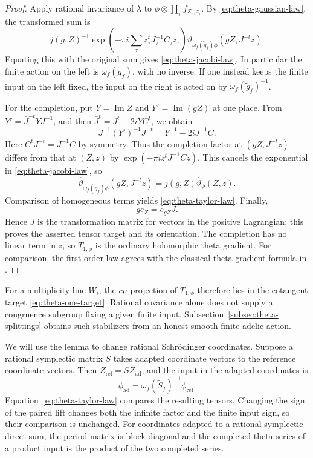 \begin{proof}
Apply rational invariance of \(\lambda\) to
\(\phi\otimes\prod_\tau f_{Z_\tau,z_\tau}\).  By
\eqref{eq:theta-gaussian-law}, the transformed sum is
\[
 j(g,Z)^{-1}
 \exp\!\left(-\pi i\sum_\tau z_\tau^tJ_\tau^{-1}C_\tau z_\tau\right)
 \vartheta_{\omega_f(\widetilde g_f)\phi}(gZ,J^{-t}z).
\]
Equating this with the original sum gives
\eqref{eq:theta-jacobi-law}.  In particular the finite action on
the left is \(\omega_f(\widetilde g_f)\), with no inverse.
If one instead keeps the finite input on the left fixed, the input
on the right is acted on by \(\omega_f(\widetilde g_f)^{-1}\).

For the completion, put \(Y=\operatorname{Im}Z\) and
\(Y'=\operatorname{Im}(gZ)\) at one place.  From
\(Y'=\bar J^{-t}YJ^{-1}\), and then
\(\bar J^t=J^t-2iYC^t\), we obtain
\begin{equation}\label{eq:theta-completion-identity}
 J^{-1}(Y')^{-1}J^{-t}=Y^{-1}-2iJ^{-1}C.
\end{equation}
Here \(C^tJ^{-t}=J^{-1}C\) by symmetry.  Thus the completion
factor at \((gZ,J^{-t}z)\) differs from that at \((Z,z)\) by
\(\exp(-\pi iz^tJ^{-1}Cz)\).  This cancels the exponential in
\eqref{eq:theta-jacobi-law}, so
\[
 \widehat\vartheta_{\omega_f(\widetilde g_f)\phi}(gZ,J^{-t}z)
       =j(g,Z)\widehat\vartheta_\phi(Z,z).
\]
Comparison of homogeneous terms yields
\eqref{eq:theta-taylor-law}.  Finally,
\[
 g e_Z=e_{gZ}J.
\]
Hence \(J\) is the transformation matrix for vectors in the
positive Lagrangian; this proves the asserted tensor target and
its orientation.  The completion has no linear term in \(z\), so
\(T_{1,\phi}\) is the ordinary holomorphic theta gradient.
For comparison, the first-order law agrees with the classical
theta-gradient formula in \cite[\S9.1]{MollerZagier2016}.
\end{proof}

For a multiplicity line \(W_i\), the \(c\mu\)-projection of
\(T_{1,\phi}\) therefore lies in the cotangent target
\eqref{eq:theta-one-target}.  Rational covariance alone does not
supply a congruence subgroup fixing a given finite input.
Subsection~\ref{subsec:theta-splittings} obtains such stabilizers
from an honest smooth finite-adelic action.

\begin{remark}\label{rem:theta-adapted-coordinates}
We will use the lemma to change rational Schr\"odinger coordinates.
Suppose a rational symplectic matrix \(S\) takes adapted coordinate
vectors to the reference coordinate vectors.  Then
\(Z_{\mathrm{ref}}=S Z_{\mathrm{ad}}\), and the input in the
adapted coordinates is
\[
 \phi_{\mathrm{ad}}
    =\omega_f(\widetilde S_f)^{-1}\phi_{\mathrm{ref}}.
\]
Equation~\eqref{eq:theta-taylor-law} compares the resulting tensors.
Changing the sign of the paired lift changes both the infinite
factor and the finite input sign, so their comparison is unchanged.
For coordinates adapted to a rational symplectic direct sum, the
period matrix is block diagonal and the completed theta series of
a product input is the product of the two completed series.
\end{remark}

